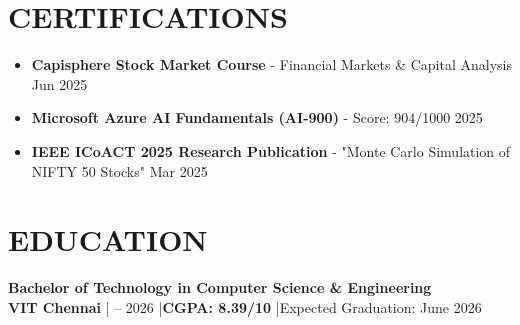 \documentclass[letterpaper,11pt]{article}
\begin{document}
\vspace{2pt}

\section*{CERTIFICATIONS}
\begin{itemize}
  \item \textbf{Capisphere Stock Market Course} - Financial Markets \& Capital Analysis \hfill Jun 2025
  \item \textbf{Microsoft Azure AI Fundamentals (AI-900)} - Score: 904/1000 \hfill 2025
  \item \textbf{IEEE ICoACT 2025 Research Publication} - "Monte Carlo Simulation of NIFTY 50 Stocks" \hfill Mar 2025
\end{itemize}

\vspace{2pt}

\section*{EDUCATION}
\textbf{Bachelor of Technology in Computer Science \& Engineering} \\
\textbf{VIT Chennai} \quad| – 2026 \quad|\quad \textbf{CGPA: 8.39/10} \quad|\quad Expected Graduation: June 2026
\end{document}
